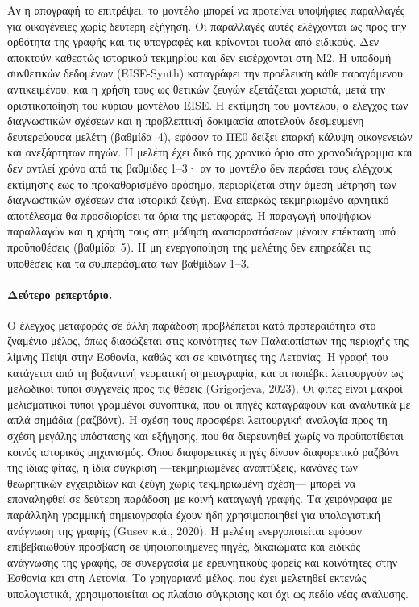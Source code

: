 \documentclass[11pt,a4paper]{article}
\begin{document}
Αν η απογραφή το επιτρέψει, το μοντέλο μπορεί να προτείνει υποψήφιες παραλλαγές για οικογένειες χωρίς δεύτερη εξήγηση. Οι παραλλαγές αυτές ελέγχονται ως προς την ορθότητα της γραφής και τις υπογραφές και κρίνονται τυφλά από ειδικούς. Δεν αποκτούν καθεστώς ιστορικού τεκμηρίου και δεν εισέρχονται στη M2. Η υποδομή συνθετικών δεδομένων (EISE-Synth) καταγράφει την προέλευση κάθε παραγόμενου αντικειμένου, και η χρήση τους ως θετικών ζευγών εξετάζεται χωριστά, μετά την οριστικοποίηση του κύριου μοντέλου EISE. Η εκτίμηση του μοντέλου, ο έλεγχος των διαγνωστικών σχέσεων και η προβλεπτική δοκιμασία αποτελούν δεσμευμένη δευτερεύουσα μελέτη (βαθμίδα~4), εφόσον το ΠΕ0 δείξει επαρκή κάλυψη οικογενειών και ανεξάρτητων πηγών. Η μελέτη έχει δικό της χρονικό όριο στο χρονοδιάγραμμα και δεν αντλεί χρόνο από τις βαθμίδες 1--3· αν το μοντέλο δεν περάσει τους ελέγχους εκτίμησης έως το προκαθορισμένο ορόσημο, περιορίζεται στην άμεση μέτρηση των διαγνωστικών σχέσεων στα ιστορικά ζεύγη. Ένα επαρκώς τεκμηριωμένο αρνητικό αποτέλεσμα θα προσδιορίσει τα όρια της μεταφοράς. Η παραγωγή υποψήφιων παραλλαγών και η χρήση τους στη μάθηση αναπαραστάσεων μένουν επέκταση υπό προϋποθέσεις (βαθμίδα~5). Η μη ενεργοποίηση της μελέτης δεν επηρεάζει τις υποθέσεις και τα συμπεράσματα των βαθμίδων 1--3.

\paragraph{Δεύτερο ρεπερτόριο.} Ο έλεγχος μεταφοράς σε άλλη παράδοση προβλέπεται κατά προτεραιότητα στο ζναμένιο μέλος, όπως διασώζεται στις κοινότητες των Παλαιοπίστων της περιοχής της λίμνης Πείψι στην Εσθονία, καθώς και σε κοινότητες της Λετονίας. Η γραφή του κατάγεται από τη βυζαντινή νευματική σημειογραφία, και οι ποπέβκι λειτουργούν ως μελωδικοί τύποι συγγενείς προς τις θέσεις (Grigorjeva, 2023). Οι φίτες είναι μακροί μελισματικοί τύποι γραμμένοι συνοπτικά, που οι πηγές καταγράφουν και αναλυτικά με απλά σημάδια (ραζβόντ). Η σχέση τους προσφέρει λειτουργική αναλογία προς τη σχέση μεγάλης υπόστασης και εξήγησης, που θα διερευνηθεί χωρίς να προϋποτίθεται κοινός ιστορικός μηχανισμός. Όπου διαφορετικές πηγές δίνουν διαφορετικό ραζβόντ της ίδιας φίτας, η ίδια σύγκριση ---τεκμηριωμένες αναπτύξεις, κανόνες των θεωρητικών εγχειριδίων και ζεύγη χωρίς τεκμηριωμένη σχέση--- μπορεί να επαναληφθεί σε δεύτερη παράδοση με κοινή καταγωγή γραφής. Τα χειρόγραφα με παράλληλη γραμμική σημειογραφία έχουν ήδη χρησιμοποιηθεί για υπολογιστική ανάγνωση της γραφής (Gusev κ.ά., 2020). Η μελέτη ενεργοποιείται εφόσον επιβεβαιωθούν πρόσβαση σε ψηφιοποιημένες πηγές, δικαιώματα και ειδικός ανάγνωσης της γραφής, σε συνεργασία με ερευνητικούς φορείς και κοινότητες στην Εσθονία και στη Λετονία. Το γρηγοριανό μέλος, που έχει μελετηθεί εκτενώς υπολογιστικά, χρησιμοποιείται ως πλαίσιο σύγκρισης και όχι ως πεδίο νέας ανάλυσης.
\end{document}
